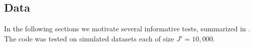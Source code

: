 \subsection{Data}

In the following sections we motivate several informative tests, summarized in .  
The code was tested on simulated datasets each of size $J'=10,000$.  

%
%
%
